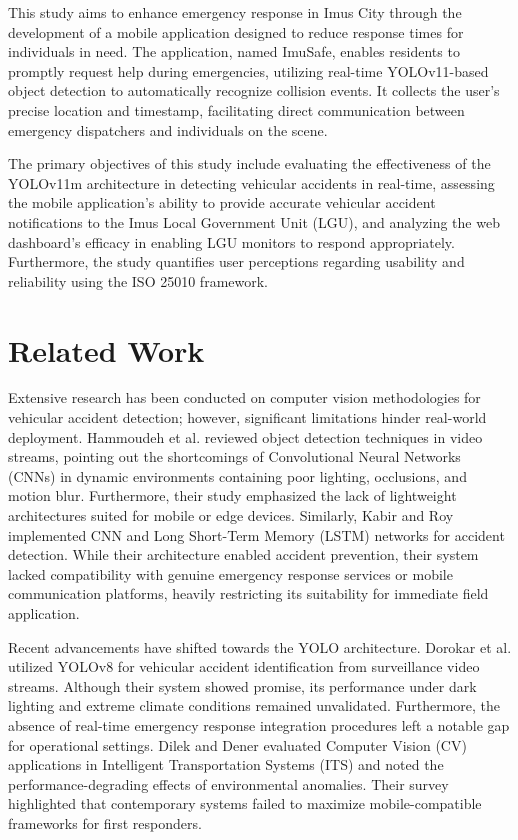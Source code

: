 \documentclass[conference]{IEEEtran}
\begin{document}
This study aims to enhance emergency response in Imus City through the development of a mobile application designed to reduce response times for individuals in need. The application, named ImuSafe, enables residents to promptly request help during emergencies, utilizing real-time YOLOv11-based object detection to automatically recognize collision events. It collects the user's precise location and timestamp, facilitating direct communication between emergency dispatchers and individuals on the scene. 

The primary objectives of this study include evaluating the effectiveness of the YOLOv11m architecture in detecting vehicular accidents in real-time, assessing the mobile application's ability to provide accurate vehicular accident notifications to the Imus Local Government Unit (LGU), and analyzing the web dashboard's efficacy in enabling LGU monitors to respond appropriately. Furthermore, the study quantifies user perceptions regarding usability and reliability using the ISO 25010 framework.

\section{Related Work}

Extensive research has been conducted on computer vision methodologies for vehicular accident detection; however, significant limitations hinder real-world deployment. Hammoudeh et al. \cite{b7} reviewed object detection techniques in video streams, pointing out the shortcomings of Convolutional Neural Networks (CNNs) in dynamic environments containing poor lighting, occlusions, and motion blur. Furthermore, their study emphasized the lack of lightweight architectures suited for mobile or edge devices. Similarly, Kabir and Roy \cite{b8} implemented CNN and Long Short-Term Memory (LSTM) networks for accident detection. While their architecture enabled accident prevention, their system lacked compatibility with genuine emergency response services or mobile communication platforms, heavily restricting its suitability for immediate field application.

Recent advancements have shifted towards the YOLO architecture. Dorokar et al. \cite{b3} utilized YOLOv8 for vehicular accident identification from surveillance video streams. Although their system showed promise, its performance under dark lighting and extreme climate conditions remained unvalidated. Furthermore, the absence of real-time emergency response integration procedures left a notable gap for operational settings. Dilek and Dener \cite{b4} evaluated Computer Vision (CV) applications in Intelligent Transportation Systems (ITS) and noted the performance-degrading effects of environmental anomalies. Their survey highlighted that contemporary systems failed to maximize mobile-compatible frameworks for first responders.
\end{document}
